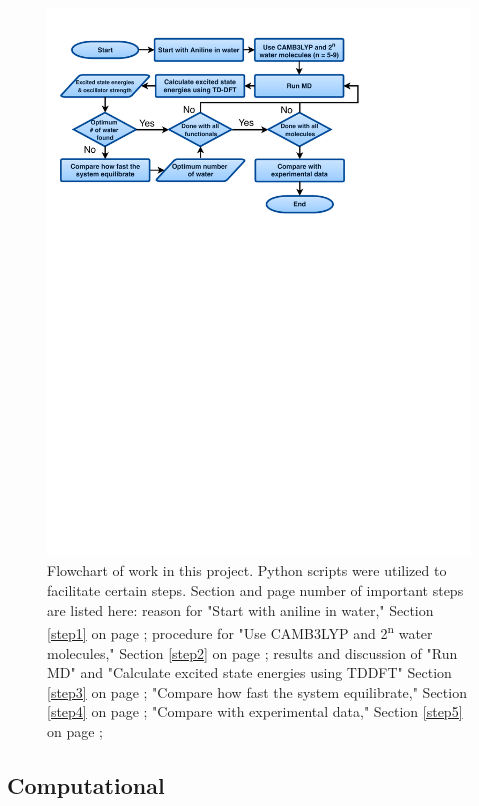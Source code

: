 \documentclass[
journal=jpcbfk, %
manuscript=article]{achemso}
\begin{document}
	\begin{figure}[!htb]
		\centering		
		\includegraphics{images/flowchart.pdf}
		\caption{Flowchart of work in this project. Python scripts were utilized to facilitate certain steps. Section and page number of important steps are listed here: reason for "Start with aniline in water," Section \ref{step1} on page \pageref{step1}; procedure for "Use CAMB3LYP and 2\textsuperscript{n} water molecules," Section \ref{step2} on page \pageref{step2}; results and discussion of "Run MD" and "Calculate excited state energies using TDDFT" Section \ref{step3} on page \pageref{step3}; "Compare how fast the system equilibrate," Section \ref{step4} on page \pageref{step4}; "Compare with experimental data," Section \ref{step5} on page \pageref{step5};}
		\label{fig:flowchart}
	\end{figure}
	
	\subsection{Computational}
	
\end{document}
